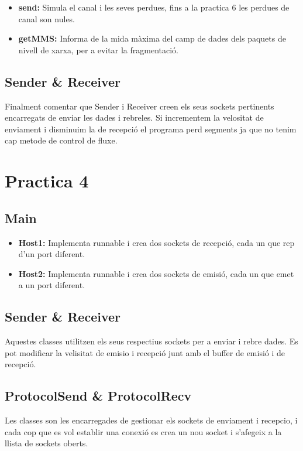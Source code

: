 \documentclass[12pt, a4papre]{article}
\begin{document}
	\begin{itemize}
		\item \textbf{send:}  Simula el canal i les seves perdues, fins a la practica 6 les perdues de canal son nules. 
		\item \textbf{getMMS:} Informa de la mida màxima del camp de dades dels paquets de nivell de xarxa, per a evitar la fragmentació.
	\end{itemize}
	
	\subsection{Sender \& Receiver} 
	Finalment comentar que Sender i Receiver creen els seus sockets pertinents encarregats de enviar les dades i rebreles. Si incrementem la velositat de enviament i disminuim la de recepció el programa perd segments ja que no tenim cap metode de control de fluxe.
	
	\section{Practica 4}
	
	\subsection{Main} 
	
	\begin{itemize}
		\item \textbf{Host1:}  Implementa runnable i crea dos sockets de recepció, cada un que rep d'un port diferent.
		\item \textbf{Host2:}  Implementa runnable i crea dos sockets de emisió, cada un que emet a un port diferent.
	\end{itemize}
	
	\subsection{Sender \& Receiver} 
	
	Aquestes classes utilitzen els seus respectius sockets per a enviar i rebre dades. Es pot modificar la velisitat de emisio i recepció junt amb el buffer de emisió i de recepció.
	
	\subsection{ProtocolSend \& ProtocolRecv} 
	
	Les classes son les encarregades de gestionar els sockets de enviament i recepcio, i cada cop que es vol establir una conexió es crea un nou socket i s'afegeix a la llista de sockets oberts.
	
\end{document}
